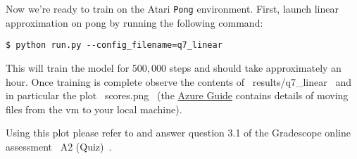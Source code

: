 \item {}

Now we're ready to train on the Atari \texttt{Pong} environment. First, launch linear approximation on pong by running the following command:
\begin{lstlisting}
$ python run.py --config_filename=q7_linear
\end{lstlisting} 
This will train the model for $500,000$ steps and should take approximately an hour. Once training is complete observe the contents of ~results/q7_linear~ and in particular the plot ~scores.png~ (the \href{https://github.com/scpd-proed/XCS234-Handouts/blob/main/Azure/Azure%20Guide.pdf}{Azure Guide} contains details of moving files from the vm to your local machine). 

Using this plot please refer to and answer question 3.1 of the Gradescope online assessment ~A2 (Quiz)~. 
